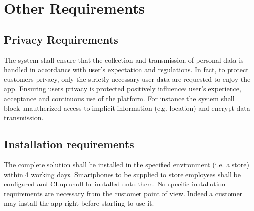 \section{Other Requirements}

\subsection{Privacy Requirements}\label{req:privacy}
The system shall ensure that the collection and transmission of personal data is handled in accordance with user’s expectation and regulations.\newline
In fact, to protect customers privacy, only the strictly necessary user data are requested to enjoy the app. Ensuring users privacy is protected positively influences user’s experience, acceptance and continuous use of the platform. For instance the system shall block unauthorized access to implicit information (e.g. location) and encrypt data transmission.

\subsection{Installation requirements}
The complete solution shall be installed in the specified environment (i.e. a store) within 4 working days.\newline
Smartphones to be supplied to store employees shall be configured and CLup shall be installed onto them.\newline
No specific installation requirements are necessary from the customer point of view. Indeed a customer may install the app right before starting to use it.
